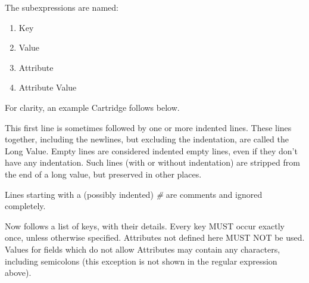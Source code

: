 \documentclass{article}
\begin{document}
The subexpressions are named:
\begin{enumerate}
	\item Key
	\item Value
	\item Attribute
	\item Attribute Value
\end{enumerate}

For clarity, an example Cartridge follows below.

This first line is sometimes followed by one or more indented lines. These
lines together, including the newlines, but excluding the indentation, are
called the Long Value. Empty lines are considered indented empty lines, even if
they don't have any indentation.  Such lines (with or without indentation) are
stripped from the end of a long value, but preserved in other places.

Lines starting with a (possibly indented) \textit{#} are comments and ignored
completely.

Now follows a list of keys, with their details. Every key MUST occur exactly
once, unless otherwise specified. Attributes not defined here MUST NOT be
used. Values for fields which do not allow Attributes may contain any
characters, including semicolons (this exception is not shown in the regular
expression above).
\end{document}
